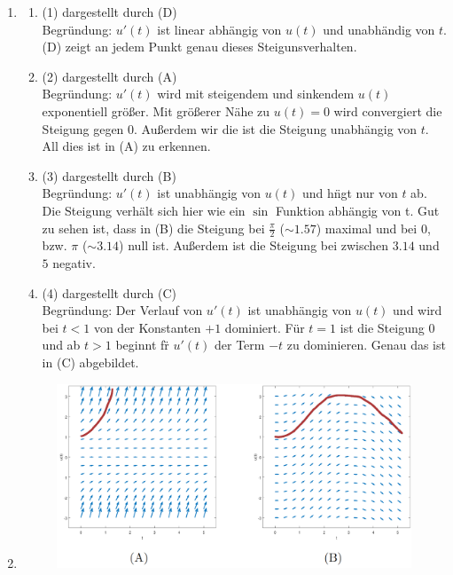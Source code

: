\documentclass[german]{uebung}
\begin{document}
\begin{exercise}{5}
	\begin{enumerate}[label=(\alph*)]
		\item
			\begin{enumerate}[label=$\bullet$]
				\item (1) dargestellt durch (D)\\
					Begr\"undung: $u'(t)$ ist linear abh\"angig von $u(t)$ und unabh\"andig von $t$.
					(D) zeigt an jedem Punkt genau dieses Steigunsverhalten.
				\item (2) dargestellt durch (A)\\
					Begr\"undung: $u'(t)$ wird mit steigendem und sinkendem $u(t)$ exponentiell gr\"o\ss er.
					Mit gr\"o\ss erer N\"ahe zu $u(t)=0$ wird convergiert die Steigung gegen 0. Au\ss erdem
					wir die ist die Steigung unabh\"angig von $t$. All dies ist in (A) zu erkennen.
				\item (3) dargestellt durch (B)\\
					Begr\"undung: $u'(t)$ ist unabh\"angig von $u(t)$ und h\"ngt nur von $t$ ab. Die Steigung
					verh\"alt sich hier wie ein $\sin$ Funktion abh\"angig von t. Gut zu sehen ist, dass in
					(B) die Steigung bei $\frac{\pi}{2}$ ($\sim 1.57$) maximal und bei $0$, bzw. $\pi$ ($\sim 3.14$)
					null ist. Au\ss erdem ist die Steigung bei zwischen $3.14$ und $5$ negativ.
				\item (4) dargestellt durch (C)\\
					Begr\"undung: Der Verlauf von $u'(t)$ ist unabh\"angig von $u(t)$ und wird bei $t<1$ von der
					Konstanten $+1$ dominiert. F\"ur $t=1$ ist die Steigung $0$ und ab $t>1$ beginnt f\"r $u'(t)$
					der Term $-t$ zu dominieren. Genau das ist in (C) abgebildet.
			\end{enumerate}
			\newpage
		\item \;
			\begin{figure}[h]
				\centering
				\includegraphics[width=0.9\linewidth]{Capture1x.png}

\end{figure}
\end{enumerate}
\end{exercise}
\end{document}
